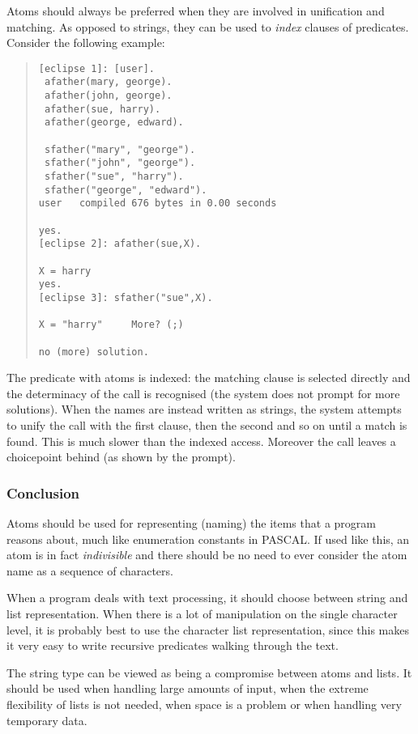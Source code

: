 Atoms should always be preferred when they are involved in unification
and matching. As opposed to strings, they can be used to \emph{index}
clauses of predicates.
Consider the following example:
\begin{quote}
\begin{verbatim}
[eclipse 1]: [user].
 afather(mary, george).
 afather(john, george).
 afather(sue, harry).
 afather(george, edward).

 sfather("mary", "george").
 sfather("john", "george").
 sfather("sue", "harry").
 sfather("george", "edward").
user   compiled 676 bytes in 0.00 seconds

yes.
[eclipse 2]: afather(sue,X).

X = harry
yes.
[eclipse 3]: sfather("sue",X).

X = "harry"     More? (;)

no (more) solution.
\end{verbatim}
\end{quote}
The predicate with atoms is indexed: the matching
clause is selected directly and the determinacy of the call is recognised
(the system does not prompt for more solutions).
When the names are instead written as strings, the system attempts
to unify the call with the first clause, then the second and so on until
a match is found. This is much slower than the indexed access.
Moreover the call leaves a choicepoint behind (as shown by the
 prompt).

\subsubsection{Conclusion}
Atoms should be used for representing (naming) the items that a
program reasons about, much like enumeration constants in PASCAL.
If used like this, an atom is in fact {\em indivisible} and there should
be no need to ever consider the atom name as a sequence of characters.

When a program deals with text processing, it should choose between string
and list representation.
When there is a lot of
manipulation on the single character level, it is probably best to use
the character list representation, since this
makes it very easy to write recursive predicates walking through the text.

The string type can be viewed as being a compromise between atoms and lists.
It should be used when handling large amounts of input, when the extreme
flexibility of lists is not needed, when space is a problem or when
handling very temporary data.


